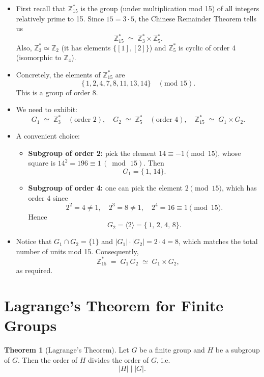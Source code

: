\documentclass[12pt]{article}
\theoremstyle{definition} %
\newtheorem{theorem}{Theorem}
\theoremstyle{plain} %
\begin{document}
\begin{itemize}
  \item First recall that $\mathbb{Z}_{15}^*$ is the group (under multiplication mod 15) of all integers relatively prime to 15.  Since $15=3\cdot 5$, the Chinese Remainder Theorem tells us
  \[
    \mathbb{Z}_{15}^* \;\simeq\; \mathbb{Z}_3^* \times \mathbb{Z}_5^*.
  \]
  Also, $\mathbb{Z}_3^* \simeq \mathbb{Z}_2$ (it has elements $\{[1],[2]\}$) and $\mathbb{Z}_5^*$ is cyclic of order 4 (isomorphic to $\mathbb{Z}_4$).
  \item Concretely, the elements of $\mathbb{Z}_{15}^*$ are 
  \[
    \{\,1,2,4,7,8,11,13,14\}
    \quad(\text{mod }15).
  \]
  This is a group of order $8$.
  \item We need to exhibit:
    \[
      G_1 \;\simeq\; \mathbb{Z}_3^*\quad (\text{order }2),
      \quad
      G_2 \;\simeq\; \mathbb{Z}_5^*\quad (\text{order }4),
      \quad
      \mathbb{Z}_{15}^* \;\simeq\; G_1 \times G_2.
    \]
  \item A convenient choice:
    \begin{itemize}
      \item \textbf{Subgroup of order 2:}  pick the element $14 \equiv -1 \pmod{15}$, whose square is $14^2=196 \equiv 1 \,(\bmod\,15)$. Then 
      \[
        G_1 = \{\,1,\,14\}.
      \]
      \item \textbf{Subgroup of order 4:} one can pick the element $2\pmod{15}$, which has order 4 since
      \[
        2^2 = 4 \neq 1,\quad 2^3 = 8 \neq 1,\quad 2^4 = 16 \equiv 1\pmod{15}.
      \]
      Hence
      \[
        G_2 = \langle 2 \rangle = \{\,1,\,2,\,4,\,8\}.
      \]
    \end{itemize}
  \item Notice that $G_1 \cap G_2 = \{1\}$ and $|G_1|\cdot |G_2| = 2\cdot 4 = 8$, which matches the total number of units mod 15.  Consequently,
  \[
    \mathbb{Z}_{15}^* \;=\; G_1 \,G_2 \;\simeq\; G_1 \times G_2,
  \]
  as required.
\end{itemize}

\section*{Lagrange's Theorem for Finite Groups}

\begin{theorem}[Lagrange's Theorem]
Let $G$ be a finite group and $H$ be a subgroup of $G$. Then the order of $H$ divides the order of $G$, i.e.
\[
  |H|\; \Big|\; |G|.
\]
\end{theorem}
\end{document}
